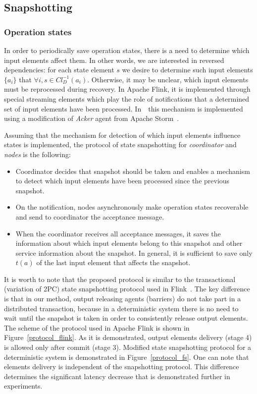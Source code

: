 \subsection{Snapshotting}

\subsubsection{Operation states}

In order to periodically save operation states, there is a need to determine which input elements affect them. In other words, we are interested in reversed dependencies: for each state element $s$ we desire to determine such input elements $\{a_i\}$ that $\forall i, s \in Cl_D^{-1}(a_i)$. Otherwise, it may be unclear, which input elements must be reprocessed during recovery. In Apache Flink, it is implemented through special streaming elements which play the role of notifications that a determined set of input elements have been processed. In~\FlameStream\ this mechanism is implemented using a modification of {\em Acker} agent from Apache Storm~\cite{apache:storm}. 

Assuming that the mechanism for detection of which input elements influence states is implemented, the protocol of state snapshotting for {\em coordinator} and {\em nodes} is the following:

\begin{itemize}
    \item Coordinator decides that snapshot should be taken and enables a mechanism to detect which input elements have been processed since the previous snapshot.
    \item On the notification, nodes asynchronously make operation states recoverable and send to coordinator the acceptance message.
    \item When the coordinator receives all acceptance messages, it saves the information about which input elements belong to this snapshot and other service information about the snapshot. In general, it is sufficient to save only $t(a)$ of the last input element that affects the snapshot.
\end{itemize}

It is worth to note that the proposed protocol is similar to the transactional (variation of 2PC) state snapshotting protocol used in Flink~\cite{Carbone:2017:SMA:3137765.3137777}. The key difference is that in our method, output releasing agents (barriers) do not take part in a distributed transaction, because in a deterministic system there is no need to wait until the snapshot is taken in order to consistently release output elements. The scheme of the protocol used in Apache Flink is shown in Figure~\ref{protocol_flink}. As it is demonstrated, output elements delivery (stage 4) is allowed only after commit (stage 3). Modified state snapshotting protocol for a deterministic system is demonstrated in Figure~\ref{protocol_fs}. One can note that elements delivery is independent of the snapshotting protocol. This difference determines the significant latency decrease that is demonstrated further in experiments.

